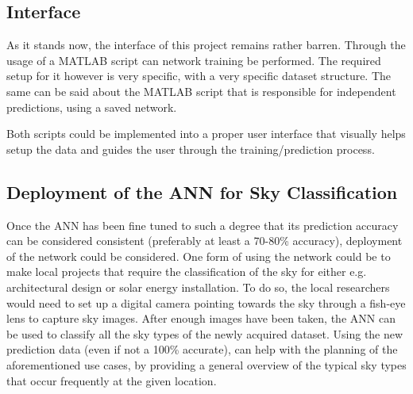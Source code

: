 \subsection{Interface}
As it stands now, the interface of this project remains rather barren. Through the usage of a MATLAB script can network training be performed. The required setup for it however is very specific, with a very specific dataset structure. The same can be said about the MATLAB script that is responsible for independent predictions, using a saved network.

Both scripts could be implemented into a proper user interface that visually helps setup the data and guides the user through the training/prediction process.

\subsection{Deployment of the ANN for Sky Classification}
Once the ANN has been fine tuned to such a degree that its prediction accuracy can be considered consistent (preferably at least a 70-80\% accuracy), deployment of the network could be considered. One form of using the network could be to make local projects that require the classification of the sky for either e.g. architectural design or solar energy installation. To do so, the local researchers would need to set up a digital camera pointing towards the sky through a fish-eye lens to capture sky images. After enough images have been taken, the ANN can be used to classify all the sky types of the newly acquired dataset. Using the new prediction data (even if not a 100\% accurate), can help with the planning of the aforementioned use cases, by providing a general overview of the typical sky types that occur frequently at the given location.